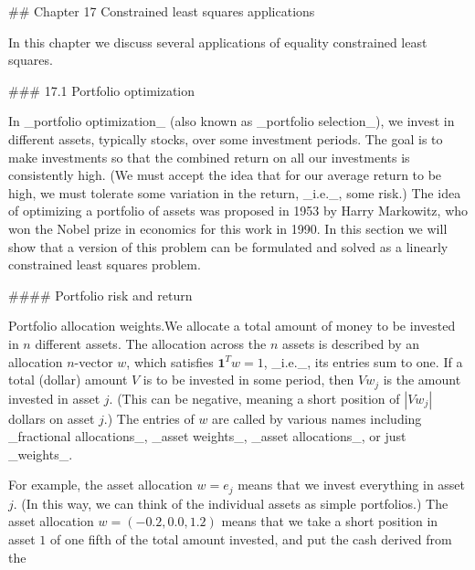 

## Chapter 17 Constrained least squares applications

In this chapter we discuss several applications of equality constrained least squares.

### 17.1 Portfolio optimization

In _portfolio optimization_ (also known as _portfolio selection_), we invest in different assets, typically stocks, over some investment periods. The goal is to make investments so that the combined return on all our investments is consistently high. (We must accept the idea that for our average return to be high, we must tolerate some variation in the return, _i.e._, some risk.) The idea of optimizing a portfolio of assets was proposed in 1953 by Harry Markowitz, who won the Nobel prize in economics for this work in 1990. In this section we will show that a version of this problem can be formulated and solved as a linearly constrained least squares problem.

#### Portfolio risk and return

Portfolio allocation weights.We allocate a total amount of money to be invested in \(n\) different assets. The allocation across the \(n\) assets is described by an allocation \(n\)-vector \(w\), which satisfies \(\mathbf{1}^{T}w=1\), _i.e._, its entries sum to one. If a total (dollar) amount \(V\) is to be invested in some period, then \(Vw_{j}\) is the amount invested in asset \(j\). (This can be negative, meaning a short position of \(|Vw_{j}|\) dollars on asset \(j\).) The entries of \(w\) are called by various names including _fractional allocations_, _asset weights_, _asset allocations_, or just _weights_.

For example, the asset allocation \(w=e_{j}\) means that we invest everything in asset \(j\). (In this way, we can think of the individual assets as simple portfolios.) The asset allocation \(w=(-0.2,0.0,1.2)\) means that we take a short position in asset \(1\) of one fifth of the total amount invested, and put the cash derived from the